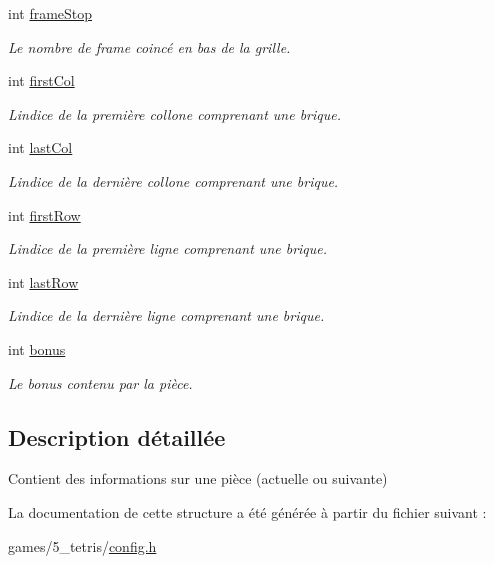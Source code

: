\begin{DoxyCompactItemize}
\mbox{\label{structPiece_a0c322226d3c4a4800386ffedec5fe19d}} 
int \hyperlink{structPiece_a0c322226d3c4a4800386ffedec5fe19d}{frame\+Stop}
\begin{DoxyCompactList}\small\item\em Le nombre de frame coincé en bas de la grille. \end{DoxyCompactList}\item 
\mbox{\label{structPiece_a2bb440d2a9fcf8f93cef9c8fef275f08}} 
int \hyperlink{structPiece_a2bb440d2a9fcf8f93cef9c8fef275f08}{first\+Col}
\begin{DoxyCompactList}\small\item\em L\textquotesingle{}indice de la première collone comprenant une brique. \end{DoxyCompactList}\item 
\mbox{\label{structPiece_a83ab63b7aa486a694dab9b6f80406bd8}} 
int \hyperlink{structPiece_a83ab63b7aa486a694dab9b6f80406bd8}{last\+Col}
\begin{DoxyCompactList}\small\item\em L\textquotesingle{}indice de la dernière collone comprenant une brique. \end{DoxyCompactList}\item 
\mbox{\label{structPiece_aef999c7196efc1329147948b48b154fc}} 
int \hyperlink{structPiece_aef999c7196efc1329147948b48b154fc}{first\+Row}
\begin{DoxyCompactList}\small\item\em L\textquotesingle{}indice de la première ligne comprenant une brique. \end{DoxyCompactList}\item 
\mbox{\label{structPiece_ace79b5c90dfa592dce72849ef1551446}} 
int \hyperlink{structPiece_ace79b5c90dfa592dce72849ef1551446}{last\+Row}
\begin{DoxyCompactList}\small\item\em L\textquotesingle{}indice de la dernière ligne comprenant une brique. \end{DoxyCompactList}\item 
\mbox{\label{structPiece_a21a6e1305c3f396d42ee151e8751b469}} 
int \hyperlink{structPiece_a21a6e1305c3f396d42ee151e8751b469}{bonus}
\begin{DoxyCompactList}\small\item\em Le bonus contenu par la pièce. \end{DoxyCompactList}\end{DoxyCompactItemize}


\subsection{Description détaillée}
Contient des informations sur une pièce (actuelle ou suivante) 

La documentation de cette structure a été générée à partir du fichier suivant \+:\begin{DoxyCompactItemize}
\item 
games/5\+\_\+tetris/\hyperlink{config_8h}{config.\+h}\end{DoxyCompactItemize}
